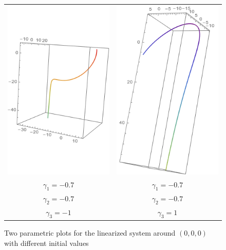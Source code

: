 \documentclass{article}
\begin{document}
\begin{figure}[h]
	\centering
	\begin{tabular}{c c}
		\includegraphics[scale=0.5]{gen_sln_01_01} & \includegraphics[scale=0.5]{gen_sln_01_02} \\
		$\gamma_{1}=-0.7$                          & $\gamma_{1}=-0.7$                          \\
		$\gamma_{2}=-0.7$                          & $\gamma_{2}=-0.7$                          \\
		$\gamma_{3}=-1$                            & $\gamma_{3}=1$                             \\
	\end{tabular}
	\caption{Two parametric plots for the linearized system around $(0,0,0)$ with different initial values}
	\label{fig:zero_sln}
\end{figure}
\end{document}
